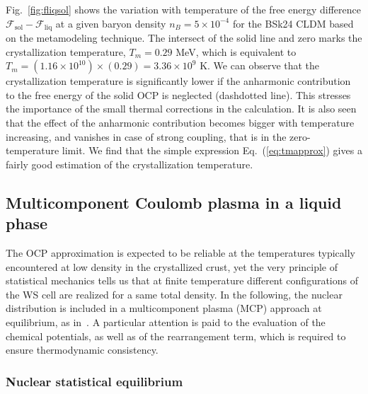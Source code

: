 Fig.~\ref{fig:fliqsol} shows the variation with temperature of the free energy
difference $\mathcal{F}_{\text{sol}}-\mathcal{F}_{\text{liq}}$ at a given
baryon density $n_B = 5\times 10^{-4}$ for the BSk24 CLDM based on the 
metamodeling technique. The intersect of the solid line and zero marks
the crystallization temperature, $T_m = 0.29$ MeV, which is equivalent to $T_m
= (1.16\times 10^{10}) \times (0.29) = 3.36 \times 10^9$ K. We can observe that
the crystallization temperature is significantly lower if the 
anharmonic contribution to the free energy of the solid OCP is neglected 
(dashdotted line). This stresses the importance of the small thermal
corrections in the calculation. It is also seen that the effect of the 
anharmonic contribution becomes bigger with temperature increasing, and 
vanishes in case of strong coupling, that is in the zero-temperature limit. We
find that the simple expression Eq.~(\ref{eq:tmapprox}) gives a fairly good
estimation of the crystallization temperature.

\subsection{Multicomponent Coulomb plasma in a liquid phase}

The OCP approximation is expected to be reliable at the temperatures
typically encountered at low density in the crystallized crust, yet the 
very principle of statistical mechanics tells us that at finite temperature 
different configurations of the WS cell are realized for a same total density.
In the following, the nuclear distribution is included in a multicomponent 
plasma (MCP) approach at equilibrium, as in~\cite{Fantina2020,Carreau2020}. A 
particular attention is paid to the evaluation of the chemical potentials, as 
well as of the rearrangement term, which is required to ensure thermodynamic 
consistency. 

\subsubsection{Nuclear statistical equilibrium}

